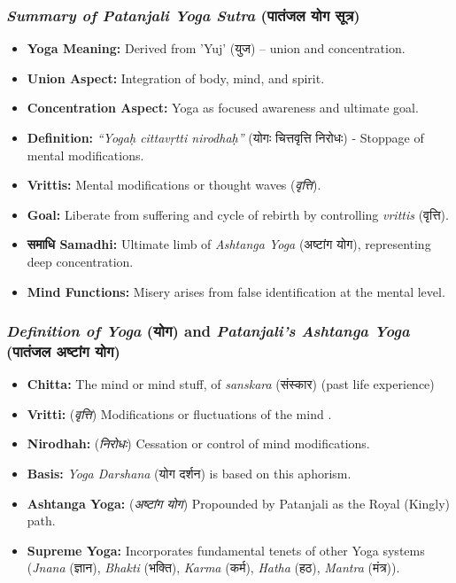 \begin{frame}[fragile]\frametitle{\textit{Summary of Patanjali Yoga Sutra} (पातंजल योग सूत्र)}

    \begin{itemize}
        \item \textbf{Yoga Meaning:} Derived from 'Yuj' (युज) – union and concentration.
        \item \textbf{Union Aspect:} Integration of body, mind, and spirit.
        \item \textbf{Concentration Aspect:} Yoga as focused awareness and ultimate goal.
        \item \textbf{Definition:} \textit{“Yogaḥ cittavṛtti nirodhaḥ”} (योगः चित्तवृत्ति निरोधः) - Stoppage of mental modifications.
        \item \textbf{Vrittis:} Mental modifications or thought waves (\textit{वृत्ति}).
        \item \textbf{Goal:} Liberate from suffering and cycle of rebirth by controlling \textit{vrittis} (वृत्ति).
        \item \textbf{समाधि Samadhi:} Ultimate limb of \textit{Ashtanga Yoga} (अष्टांग योग), representing deep concentration.
        \item \textbf{Mind Functions:} Misery arises from false identification at the mental level.
    \end{itemize}

\end{frame}

\begin{frame}[fragile]\frametitle{\textit{Definition of Yoga} (योग) and \textit{Patanjali's Ashtanga Yoga} (पातंजल अष्टांग योग)}

    \begin{itemize}
        \item \textbf{Chitta:} The mind or mind stuff, of \textit{sanskara} (संस्कार) (past life experience)
        \item \textbf{Vritti:} (\textit{वृत्ति}) Modifications or fluctuations of the mind .
        \item \textbf{Nirodhah:}  (\textit{निरोधः}) Cessation or control of mind modifications.
        \item \textbf{Basis:} \textit{Yoga Darshana} (योग दर्शन) is based on this aphorism.
        \item \textbf{Ashtanga Yoga:}  (\textit{अष्टांग योग}) Propounded by Patanjali as the Royal (Kingly) path.
        \item \textbf{Supreme Yoga:} Incorporates fundamental tenets of other Yoga systems (\textit{Jnana} (ज्ञान), \textit{Bhakti} (भक्ति), \textit{Karma} (कर्म), \textit{Hatha} (हठ), \textit{Mantra} (मंत्र)).
    \end{itemize}

\end{frame}


